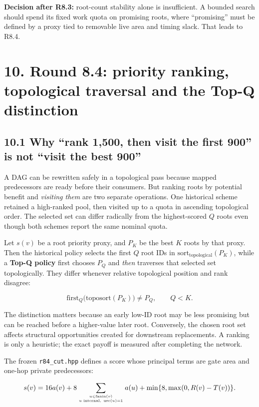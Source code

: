 \textbf{Decision after R8.3:} root-count stability alone is insufficient. A bounded search should spend its fixed work quota on promising roots, where ``promising'' must be defined by a proxy tied to removable live area and timing slack. That leads to R8.4.

\section{10. Round 8.4: priority ranking, topological traversal and the Top-Q distinction}\label{round-8.4-priority-ranking-topological-traversal-and-the-top-q-distinction}

\subsection{10.1 Why ``rank 1,500, then visit the first 900'' is not ``visit the best 900''}\label{why-rank-1500-then-visit-the-first-900-is-not-visit-the-best-900}

A DAG can be rewritten safely in a topological pass because mapped predecessors are ready before their consumers. But ranking roots by potential benefit and \emph{visiting them} are two separate operations. One historical scheme retained a high-ranked pool, then visited up to a quota in ascending topological order. The selected set can differ radically from the highest-scored \(Q\) roots even though both schemes report the same nominal quota.

Let \(s(v)\) be a root priority proxy, and \(P_K\) be the best \(K\) roots by that proxy. Then the historical policy selects the first \(Q\) root IDs in \(\mathrm{sort}_{\mathrm{topological}}(P_K)\), while a \textbf{Top-Q policy} first chooses \(P_Q\) and \emph{then} traverses that selected set topologically. They differ whenever relative topological position and rank disagree:

\[
\mathrm{first}_{Q}\bigl(\mathrm{toposort}(P_K)\bigr)
\ne P_Q,\qquad Q<K.
\]

The distinction matters because an early low-ID root may be less promising but can be reached before a higher-value later root. Conversely, the chosen root set affects structural opportunities created for downstream replacements. A ranking is only a heuristic; the exact payoff is measured after completing the network.

The frozen \texttt{r84\_cut.hpp} defines a score whose principal terms are gate area and one-hop private predecessors:

\[
s(v)=16a(v)+8\sum_{u\in\mathrm{fanin}(v)\atop u\text{ internal},\ \mathrm{use}(u)=1}a(u)
+\min\{8,\max(0,R(v)-T(v))\}.
\]

